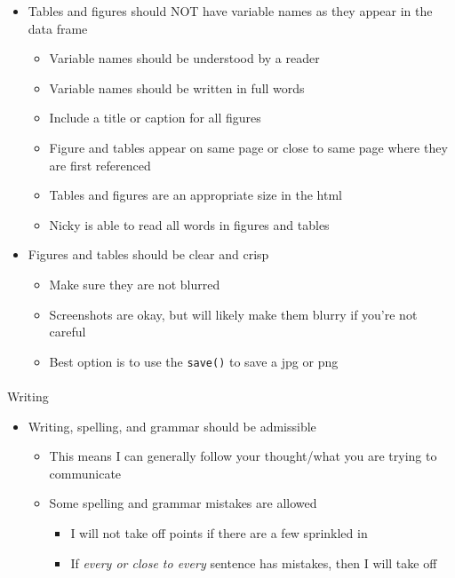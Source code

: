 \documentclass[
  letterpaper,
  DIV=11,
  numbers=noendperiod]{scrartcl}
\makeatletter
\let\oldparagraph\paragraph
\renewcommand{\paragraph}{
    \@ifstar
      \xxxParagraphStar
      \xxxParagraphNoStar
  }
\newcommand{\xxxParagraphStar}[1]{\oldparagraph*{#1}\mbox{}}
\newcommand{\xxxParagraphNoStar}[1]{\oldparagraph{#1}\mbox{}}
\providecommand{\tightlist}{%
  \setlength{\itemsep}{0pt}\setlength{\parskip}{0pt}}
\makeatother
\begin{document}
\begin{itemize}
\tightlist
\item
  Tables and figures should NOT have variable names as they appear in
  the data frame

  \begin{itemize}
  \tightlist
  \item
    Variable names should be understood by a reader
  \item
    Variable names should be written in full words
  \item
    Include a title or caption for all figures
  \item
    Figure and tables appear on same page or close to same page where
    they are first referenced
  \item
    Tables and figures are an appropriate size in the html
  \item
    Nicky is able to read all words in figures and tables
  \end{itemize}
\item
  Figures and tables should be clear and crisp

  \begin{itemize}
  \tightlist
  \item
    Make sure they are not blurred
  \item
    Screenshots are okay, but will likely make them blurry if you're not
    careful
  \item
    Best option is to use the \texttt{save()} to save a jpg or png
  \end{itemize}
\end{itemize}

\paragraph{Writing}\label{writing}

\begin{itemize}
\tightlist
\item
  Writing, spelling, and grammar should be admissible

  \begin{itemize}
  \tightlist
  \item
    This means I can generally follow your thought/what you are trying
    to communicate
  \item
    Some spelling and grammar mistakes are allowed

    \begin{itemize}
    \tightlist
    \item
      I will not take off points if there are a few sprinkled in
    \item
      If \emph{every or close to every} sentence has mistakes, then I
      will take off
    \end{itemize}
  \end{itemize}
\end{itemize}
\end{document}
